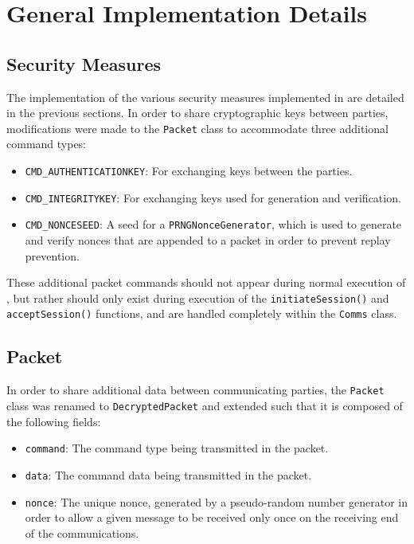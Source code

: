 \documentclass[a4paper,11pt]{article}
\begin{document}
\section{General Implementation Details}

\subsection{Security Measures}
The implementation of the various security measures implemented in 
\packageName{} are detailed in the previous sections. In order to share
cryptographic keys between parties, modifications were made to the 
\packageName{} \verb+Packet+ class to accommodate three additional command types:
\begin{itemize}
\item \verb+CMD_AUTHENTICATIONKEY+: For exchanging  
keys between the parties.
\item \verb+CMD_INTEGRITYKEY+: For exchanging  keys used for
 generation and 
verification.
\item \verb+CMD_NONCESEED+: A seed for a \verb+PRNGNonceGenerator+, 
which is used to generate and verify nonces that are appended to a packet in 
order to prevent replay prevention.
\end{itemize}

These additional packet commands should not appear during normal execution of 
\serviceName{}, but rather should only exist during execution of the
\verb+initiateSession()+ and \verb+acceptSession()+ functions, and are handled 
completely within the \verb+Comms+ class.

\subsection{Packet}
In order to share additional data between communicating parties, the 
\serviceName{} \verb+Packet+ class was renamed to \verb+DecryptedPacket+ and 
extended such that it is composed of the following fields:
\begin{itemize}
\item \verb+command+: The command type being transmitted in the 
packet.
\item \verb+data+: The command data being transmitted in the packet.
\item \verb+nonce+: The unique nonce, generated by a pseudo-random number 
generator in order to allow a given message to be received only once on the 
receiving end of the communications.
\end{itemize}
\end{document}
